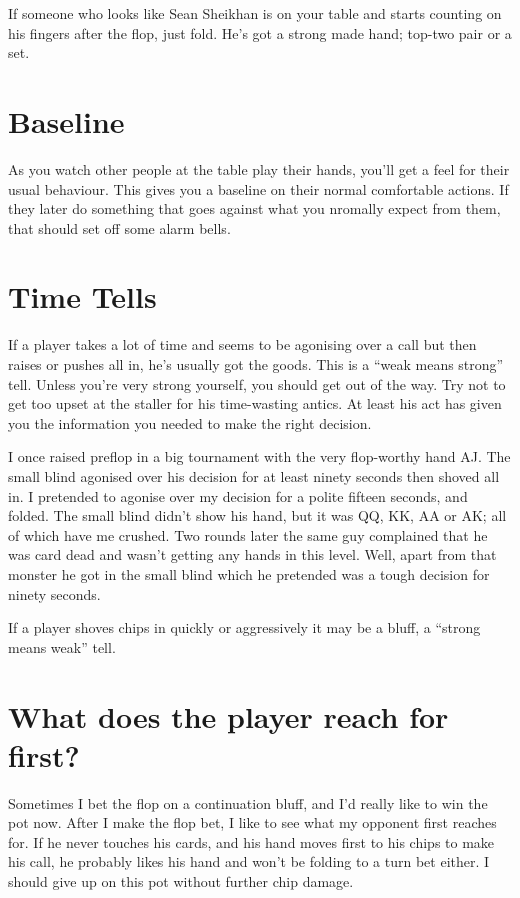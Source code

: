 If someone who looks like Sean Sheikhan is on your table and starts
counting on his fingers after the flop, just fold. He's
got a strong made hand; top-two pair or a set.

\section{Baseline}

As you watch other people at the table play their hands, you'll get a
feel for their usual behaviour. This gives you a baseline on their
normal comfortable actions. If they later do something that goes
against what you nromally expect from them, that should set off some
alarm bells.

\section{Time Tells}

If a player takes a lot of time and seems to be agonising over a call
but then raises or pushes all in, he's usually got the goods.
This is a ``weak means strong'' tell.
Unless you're very strong yourself, you should get out
of the way. Try not to get too upset at the staller for
his time-wasting antics. At least his act has given you the
information you needed to make the right decision.

I once raised preflop in a big tournament with the very flop-worthy hand
AJ. The small blind agonised over his decision for at least ninety
seconds then shoved all in. I pretended to agonise over my decision
for a polite fifteen seconds, and folded. The small blind didn't show
his hand, but it was QQ, KK, AA or AK; all of which have me crushed.
Two rounds later the same
guy complained that he was card dead and wasn't getting any hands
in this level. Well, apart from that monster he got in the small blind
which he pretended was a tough decision for ninety seconds.

If a player shoves chips in quickly or aggressively it may be a bluff,
a ``strong means weak'' tell.

\section{What does the player reach for first?}

Sometimes I bet the flop on a continuation bluff, and I'd really like
to win the pot now. After I make the flop bet, I like to see what
my opponent first reaches for. If he never touches his cards, and his
hand moves first to his chips to make his call, he probably likes his
hand and won't be folding to a turn bet either. I should
give up on this pot without further chip damage.

